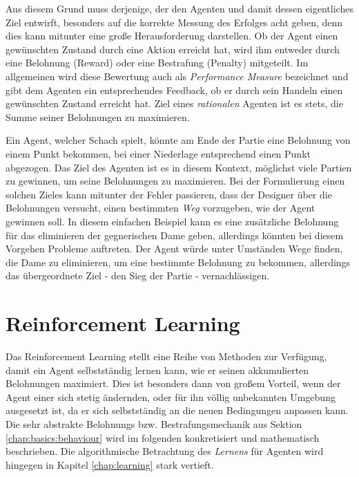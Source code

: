 Aus diesem Grund muss derjenige, der den Agenten und damit dessen eigentliches Ziel entwirft, besonders auf die korrekte Messung des Erfolges acht geben, denn dies kann mitunter eine große Herausforderung darstellen. 
Ob der Agent einen gewünschten Zustand durch eine Aktion erreicht hat, wird ihm entweder durch eine Belohnung (Reward) oder eine Bestrafung (Penalty) mitgeteilt. Im allgemeinen wird diese Bewertung auch als \textit{Performance Measure} bezeichnet und gibt dem Agenten ein entsprechendes Feedback, ob er durch sein Handeln einen gewünschten Zustand erreicht hat.
Ziel eines \textit{rationalen} Agenten ist es stets, die Summe seiner Belohnungen zu maximieren.  

Ein Agent, welcher \zB Schach spielt, könnte am Ende der Partie eine Belohnung von einem Punkt bekommen, bei einer Niederlage entsprechend einen Punkt abgezogen. Das Ziel des Agenten ist es in diesem Kontext, möglichst viele Partien zu gewinnen, um seine Belohnungen zu maximieren. 
Bei der Formulierung einen solchen Zieles kann mitunter der Fehler passieren, dass der Designer über die Belohnungen versucht, einen bestimmten \textit{Weg} vorzugeben, wie der Agent gewinnen soll. In diesem einfachen Beispiel kann es \zB eine zusätzliche Belohnung für das eliminieren der gegnerischen Dame geben, allerdings könnten bei diesem Vorgehen Probleme auftreten. Der Agent würde unter Umständen Wege finden, die Dame zu eliminieren, um eine bestimmte Belohnung zu bekommen, allerdings das übergeordnete Ziel - den Sieg der Partie - vernachlässigen.


\section{Reinforcement Learning}

Das Reinforcement Learning stellt eine Reihe von Methoden zur Verfügung, damit ein Agent selbstständig lernen kann, wie er seinen akkumulierten Belohnungen maximiert. Dies ist besonders dann von großem Vorteil, wenn der Agent einer sich stetig ändernden, oder für ihn völlig unbekannten Umgebung ausgesetzt ist, da er sich selbstständig an die neuen Bedingungen anpassen kann. Die sehr abstrakte Belohnungs bzw. Bestrafungsmechanik aus Sektion \ref{chap:basics:behaviour} wird im folgenden konkretisiert und mathematisch beschrieben.
Die algorithmische Betrachtung des \textit{Lernens} für Agenten wird hingegen in Kapitel \ref{chap:learning} stark vertieft.

